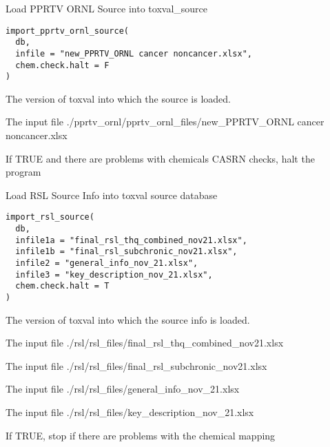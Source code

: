 \documentclass[letterpaper]{book}
\begin{document}
\begin{Description}\relax
Load PPRTV ORNL Source into toxval\_source
\end{Description}
%
\begin{Usage}
\begin{verbatim}
import_pprtv_ornl_source(
  db,
  infile = "new_PPRTV_ORNL cancer noncancer.xlsx",
  chem.check.halt = F
)
\end{verbatim}
\end{Usage}
%
\begin{Arguments}
\begin{ldescription}
\item[\code{db}] The version of toxval into which the source is loaded.

\item[\code{infile}] The input file ./pprtv\_ornl/pprtv\_ornl\_files/new\_PPRTV\_ORNL cancer noncancer.xlsx

\item[\code{chem.check.halt}] If TRUE and there are problems with chemicals CASRN checks, halt the program
\end{ldescription}
\end{Arguments}
%
\begin{Description}\relax
Load RSL Source Info into toxval source database
\end{Description}
%
\begin{Usage}
\begin{verbatim}
import_rsl_source(
  db,
  infile1a = "final_rsl_thq_combined_nov21.xlsx",
  infile1b = "final_rsl_subchronic_nov21.xlsx",
  infile2 = "general_info_nov_21.xlsx",
  infile3 = "key_description_nov_21.xlsx",
  chem.check.halt = T
)
\end{verbatim}
\end{Usage}
%
\begin{Arguments}
\begin{ldescription}
\item[\code{db}] The version of toxval into which the source info is loaded.

\item[\code{infile1a}] The input file ./rsl/rsl\_files/final\_rsl\_thq\_combined\_nov21.xlsx

\item[\code{infile1b}] The input file ./rsl/rsl\_files/final\_rsl\_subchronic\_nov21.xlsx

\item[\code{infile2}] The input file ./rsl/rsl\_files/general\_info\_nov\_21.xlsx

\item[\code{infile3}] The input file ./rsl/rsl\_files/key\_description\_nov\_21.xlsx

\item[\code{chem.check.halt}] If TRUE, stop if there are problems with the chemical mapping
\end{ldescription}
\end{Arguments}
\end{document}

